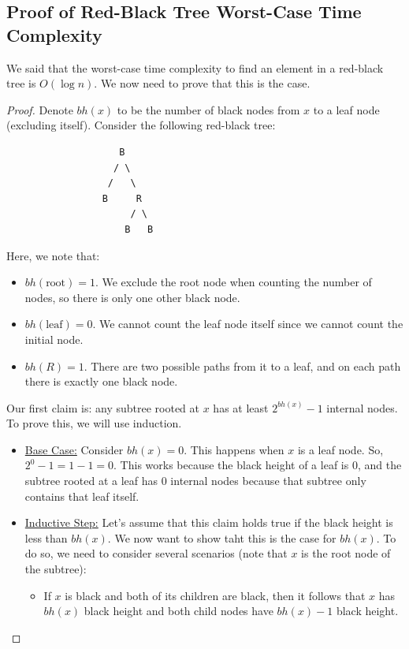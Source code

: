 \documentclass[letterpaper]{article}
\begin{document}
\subsection{Proof of Red-Black Tree Worst-Case Time Complexity}
We said that the worst-case time complexity to find an element in a red-black tree is $O(\log n)$. We now need to prove that this is the case. 

\begin{mdframed}
    \begin{proof}
        Denote $bh(x)$ to be the number of black nodes from $x$ to a leaf node (excluding itself). Consider the following red-black tree: 
        \begin{verbatim}
                    B
                   / \ 
                  /   \ 
                 B     R
                      / \ 
                     B   B
        \end{verbatim}
        Here, we note that: 
        \begin{itemize}
            \item $bh(\text{root}) = 1$. We exclude the root node when counting the number of nodes, so there is only one other black node. 
            \item $bh(\text{leaf}) = 0$. We cannot count the leaf node itself since we cannot count the initial node. 
            \item $bh(R) = 1$. There are two possible paths from it to a leaf, and on each path there is exactly one black node. 
        \end{itemize}
        Our first claim is: any subtree rooted at $x$ has at least $2^{bh(x)} - 1$ internal nodes. To prove this, we will use induction. 
        \begin{itemize}
            \item \underline{Base Case:} Consider $bh(x) = 0$. This happens when $x$ is a leaf node. So, $2^0 - 1 = 1 - 1 = 0$. This works because the black height of a leaf is 0, and the subtree rooted at a leaf has 0 internal nodes because that subtree only contains that leaf itself.
            \item \underline{Inductive Step:} Let's assume that this claim holds true if the black height is less than $bh(x)$. We now want to show taht this is the case for $bh(x)$. To do so, we need to consider several scenarios (note that $x$ is the root node of the subtree): 
            \begin{itemize}
                \item If $x$ is black and both of its children are black, then it follows that $x$ has $bh(x)$ black height and both child nodes have $bh(x) - 1$ black height. 

\end{itemize}
\end{itemize}
\end{proof}
\end{mdframed}
\end{document}
